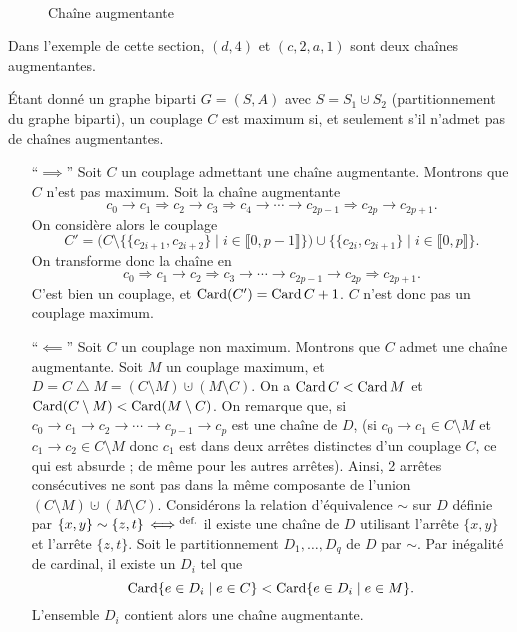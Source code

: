 \begin{exm}~
	\begin{figure}[H]
		\centering
		\caption{Chaîne augmentante}
	\end{figure}
\end{exm}

\begin{exm}
	Dans l'exemple de cette section, $(d, 4)$\/ et $(c, 2, a, 1)$\/ sont deux chaînes augmentantes.
\end{exm}

\begin{prop}
	Étant donné un graphe biparti $G = (S, A)$\/ avec $S = S_1 \cupdot S_2$ (partitionnement du graphe biparti), un couplage $C$\/ est maximum si, et seulement s'il n'admet pas de chaînes augmentantes.
\end{prop}

\begin{prv}
	\begin{itemize}
		\item[``$\implies$'']
			Soit $C$\/ un couplage admettant une chaîne augmentante. Montrons que $C$\/ n'est pas maximum.
			Soit la chaîne augmentante\footnotemark \[
				c_0 \to c_1 \Rightarrow c_2 \to c_3 \Rightarrow c_4 \to \cdots \to c_{2p - 1} \Rightarrow c_{2p} \to c_{2p+1}
			.\]
			On considère alors le couplage \[
				C' = \Big(C \setminus \big\{\{c_{2i+1},c_{2i+2} \} \mid i \in \llbracket 0,p-1 \rrbracket\big\}\Big) \cup \big\{\{c_{2i},c_{2i+1}\}  \mid i \in \llbracket 0,p \rrbracket\big\}
			.\]
			On transforme donc la chaîne en \[
				c_0 \Rightarrow c_1 \to c_2 \Rightarrow c_3 \to \cdots \to c_{2p-1} \to c_{2p} \Rightarrow c_{2p+1}
			.\]
			C'est bien un couplage, et $\operatorname{Card}(C') = \operatorname{Card} C + 1$. $C$\/ n'est donc pas un couplage maximum.
		\item[``$\impliedby$'']
			Soit $C$\/ un couplage non maximum. Montrons que $C$\/ admet une chaîne augmentante. Soit $M$\/ un couplage maximum, et $D = C \mathrel{\triangle} M = (C \setminus M) \cupdot (M \setminus C)$.
			On a $\operatorname{Card} C < \operatorname{Card} M$\/ et $\operatorname{Card}(C \setminus M) < \operatorname{Card}(M \setminus C)$.
			On remarque que, si $c_0 \to c_1 \to c_2 \to \cdots \to c_{p-1}\to c_p$\/ est une chaîne de $D$, (si $c_0 \to c_1 \in C \setminus M$\/ et $c_1 \to c_2 \in C \setminus M$\/ donc $c_1$\/ est dans deux arrêtes distinctes d'un couplage $C$, ce qui est absurde ; de même pour les autres arrêtes). Ainsi, 2 arrêtes consécutives ne sont pas dans la même composante de l'union $(C \setminus M) \cupdot (M \setminus C)$.
			Considérons la relation d'équivalence $\sim$\/ sur $D$\/ définie par $\{x,y\} \sim \{z,t\} \mathop{\iff}^{\text{def.}}$ il existe une chaîne de $D$\/ utilisant l'arrête $\{x,y\}$\/ et l'arrête $\{z,t\}$.
			Soit le partitionnement $D_1, \ldots, D_q$\/ de $D$\/ par $\sim$.
			Par inégalité de cardinal, il existe un $D_i$\/ tel que \[
				\operatorname{Card} \{e \in D_i  \mid e \in C\} < \operatorname{Card} \{e \in D_i  \mid e \in M\}
			.\] L'ensemble $D_i$\/ contient alors une chaîne augmentante.
	\end{itemize}
\end{prv}
